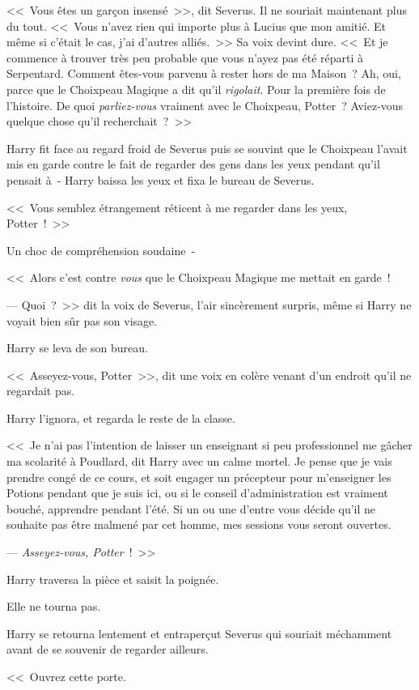 <<~Vous êtes un garçon insensé~>>, dit Severus. Il ne souriait maintenant plus du tout. <<~Vous n'avez rien qui importe plus à Lucius que mon amitié. Et même si c'était le cas, j'ai d'autres alliés.~>> Sa voix devint dure. <<~Et je commence à trouver très peu probable que vous n'ayez pas été réparti à Serpentard. Comment êtes-vous parvenu à rester hors de ma Maison~? Ah, oui, parce que le Choixpeau Magique a dit qu'il \emph{rigolait}. Pour la première fois de l'histoire. De quoi \emph{parliez-vous} vraiment avec le Choixpeau, Potter~? Aviez-vous quelque chose qu'il recherchait~?~>>

Harry fit face au regard froid de Severus puis se souvint que le Choixpeau l'avait mis en garde contre le fait de regarder des gens dans les yeux pendant qu'il pensait à~- Harry baissa les yeux et fixa le bureau de Severus.

<<~Vous semblez étrangement réticent à me regarder dans les yeux, Potter~!~>>

Un choc de compréhension soudaine~-

<<~Alors c'est contre \emph{vous} que le Choixpeau Magique me mettait en garde~!

--- Quoi~?~>> dit la voix de Severus, l'air sincèrement surpris, même si Harry ne voyait bien sûr pas son visage.

Harry se leva de son bureau.

<<~Asseyez-vous, Potter~>>, dit une voix en colère venant d'un endroit qu'il ne regardait pas.

Harry l'ignora, et regarda le reste de la classe.

<<~Je n'ai pas l'intention de laisser un enseignant si peu professionnel me gâcher ma scolarité à Poudlard, dit Harry avec un calme mortel. Je pense que je vais prendre congé de ce cours, et soit engager un précepteur pour m'enseigner les Potions pendant que je suis ici, ou si le conseil d'administration est vraiment bouché, apprendre pendant l'été. Si un ou une d'entre vous décide qu'il ne souhaite pas être malmené par cet homme, mes sessions vous seront ouvertes.

--- \emph{Asseyez-vous, Potter}~!~>>

Harry traversa la pièce et saisit la poignée.

Elle ne tourna pas.

Harry se retourna lentement et entraperçut Severus qui souriait méchamment avant de se souvenir de regarder ailleurs.

<<~Ouvrez cette porte.

